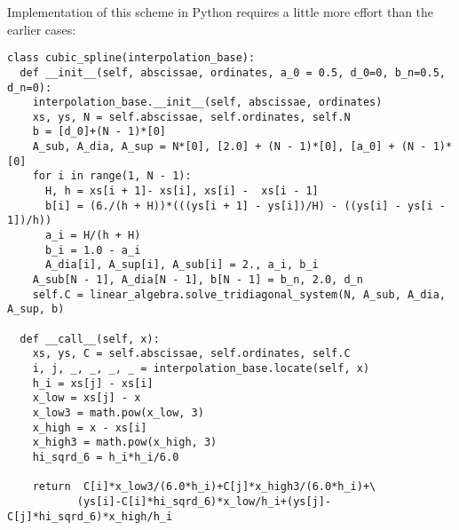 Implementation of this scheme in Python requires a little more effort than
the earlier cases:
\begin{verbatim}
class cubic_spline(interpolation_base):
  def __init__(self, abscissae, ordinates, a_0 = 0.5, d_0=0, b_n=0.5, d_n=0):
    interpolation_base.__init__(self, abscissae, ordinates)
    xs, ys, N = self.abscissae, self.ordinates, self.N
    b = [d_0]+(N - 1)*[0]
    A_sub, A_dia, A_sup = N*[0], [2.0] + (N - 1)*[0], [a_0] + (N - 1)*[0]
    for i in range(1, N - 1):
      H, h = xs[i + 1]- xs[i], xs[i] -  xs[i - 1]
      b[i] = (6./(h + H))*(((ys[i + 1] - ys[i])/H) - ((ys[i] - ys[i - 1])/h))
      a_i = H/(h + H)
      b_i = 1.0 - a_i
      A_dia[i], A_sup[i], A_sub[i] = 2., a_i, b_i
    A_sub[N - 1], A_dia[N - 1], b[N - 1] = b_n, 2.0, d_n
    self.C = linear_algebra.solve_tridiagonal_system(N, A_sub, A_dia, A_sup, b)

  def __call__(self, x):
    xs, ys, C = self.abscissae, self.ordinates, self.C
    i, j, _, _, _, _ = interpolation_base.locate(self, x)
    h_i = xs[j] - xs[i]
    x_low = xs[j] - x
    x_low3 = math.pow(x_low, 3)
    x_high = x - xs[i]
    x_high3 = math.pow(x_high, 3)
    hi_sqrd_6 = h_i*h_i/6.0

    return  C[i]*x_low3/(6.0*h_i)+C[j]*x_high3/(6.0*h_i)+\
           (ys[i]-C[i]*hi_sqrd_6)*x_low/h_i+(ys[j]-C[j]*hi_sqrd_6)*x_high/h_i
\end{verbatim}

